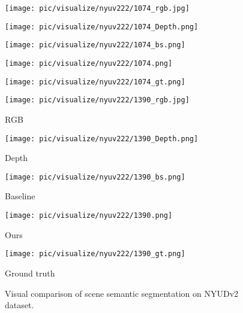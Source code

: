 \documentclass[lettersize,journal]{IEEEtran}
\begin{document}
\begin{figure*}[t]
\begin{minipage}[c]{0.158\linewidth}
        \texttt{[image: pic/visualize/nyuv222/1074\_rgb.jpg]}
    \end{minipage} 
    \begin{minipage}[c]{0.158\linewidth}
        \texttt{[image: pic/visualize/nyuv222/1074\_Depth.png]}
    \end{minipage} 
    \begin{minipage}[c]{0.158\linewidth}
        \texttt{[image: pic/visualize/nyuv222/1074\_bs.png]}
    \end{minipage} 
    \begin{minipage}[c]{0.158\linewidth}
        \texttt{[image: pic/visualize/nyuv222/1074.png]}
    \end{minipage}
    \begin{minipage}[c]{0.158\linewidth}
        \texttt{[image: pic/visualize/nyuv222/1074\_gt.png]}
    \end{minipage}
    
\begin{minipage}[c]{0.158\linewidth}
        \texttt{[image: pic/visualize/nyuv222/1390\_rgb.jpg]}
    \centerline{RGB}
    \end{minipage} 
    \begin{minipage}[c]{0.158\linewidth}
        \texttt{[image: pic/visualize/nyuv222/1390\_Depth.png]}
    \centerline{Depth}
    \end{minipage}
    \begin{minipage}[c]{0.158\linewidth}
        \texttt{[image: pic/visualize/nyuv222/1390\_bs.png]}
    \centerline{Baseline}
    \end{minipage}
    \begin{minipage}[c]{0.158\linewidth}
        \texttt{[image: pic/visualize/nyuv222/1390.png]}
    \centerline{Ours}
    \end{minipage} 
    \begin{minipage}[c]{0.158\linewidth}
        \texttt{[image: pic/visualize/nyuv222/1390\_gt.png]}
    \centerline{Ground truth}
    \end{minipage}
    \caption{Visual comparison of scene semantic segmentation on NYUDv2 dataset.}
    \label{NYUDv2_result}
\end{figure*}
 
 
 
\end{document}
